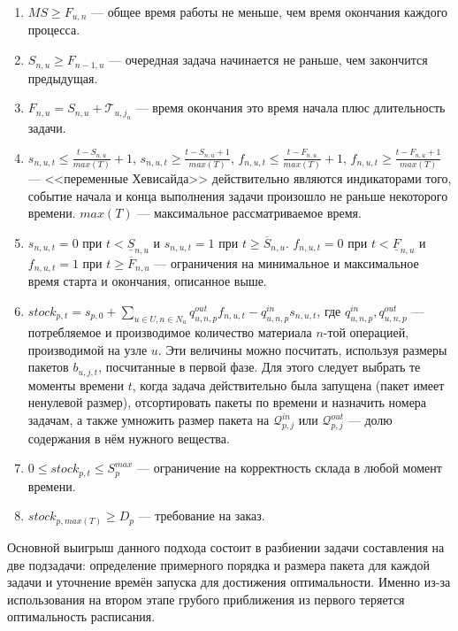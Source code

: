 \documentclass[12pt, twoside]{article}
\theoremstyle{definition}
\newcommand{\Tau}{\mathcal{T}}
\begin{document}
\begin{enumerate}
	\item $MS \geq F_{u, n}$ --- общее время работы не меньше, чем время окончания каждого процесса.
	\item $S_{n, u} \geq F_{n-1, u}$ --- очередная задача начинается не раньше, чем закончится предыдущая.
	\item $F_{n, u} = S_{n, u} + \Tau_{u, j_n}$ --- время окончания это время начала плюс длительность задачи.
	\item $s_{n, u, t} \leq \frac{t - S_{n, u}}{max(T)} + 1$, $s_{n, u, t} \geq \frac{t - S_{n, u} + 1}{max(T)}$, $f_{n, u, t} \leq \frac{t - F_{n, u}}{max(T)} + 1$, $f_{n, u, t} \geq \frac{t - F_{n, u} + 1}{max(T)}$ --- <<переменные Хевисайда>> действительно являются индикаторами того, событие начала и конца выполнения задачи произошло не раньше некоторого времени. $max(T)$ --- максимальное рассматриваемое время.
	\item $s_{n, u, t} = 0$ при $t < \underline S_{n, u}$ и $s_{n, u, t} = 1$ при $t \geq \overline S_{n, u}$. $f_{n, u, t} = 0$ при $t < \underline F_{n, u}$ и $f_{n, u, t} = 1$ при $t \geq \overline F_{n, u}$ --- ограничения на минимальное и максимальное время старта и окончания, описанное выше.
	\item $stock_{p, t} = s_{p, 0} + \displaystyle\sum_{u \in U, n \in N_u}  q^{out}_{u, n, p} f_{n, u, t} - q^{in}_{u, n, p} s_{n, u, t}$, где $q^{in}_{u, n, p}, q^{out}_{u, n, p}$ --- потребляемое и производимое количество материала $n$-той операцией, производимой на узле $u$. Эти величины можно посчитать, используя размеры пакетов $b_{u, j, t}$, посчитанные в первой фазе. Для этого следует выбрать те моменты времени $t$, когда задача действительно была запущена (пакет имеет ненулевой размер), отсортировать пакеты по времени и назначить номера задачам, а также умножить размер пакета на $\mathcal{Q}^{in}_{p, j}$ или $\mathcal{Q}^{out}_{p, j}$ --- долю содержания в нём нужного вещества.
	\item $0 \leq stock_{p, t} \leq S^{max}_p$ --- ограничение на корректность склада в любой момент времени.
	\item $stock_{p, max(T)} \geq D_p$ --- требование на заказ.
\end{enumerate}

Основной выигрыш данного подхода состоит в разбиении задачи составления на две подзадачи: определение примерного порядка и размера пакета для каждой задачи и уточнение времён запуска для достижения оптимальности. Именно из-за использования на втором этапе грубого приближения из первого теряется оптимальность расписания.
\end{document}
